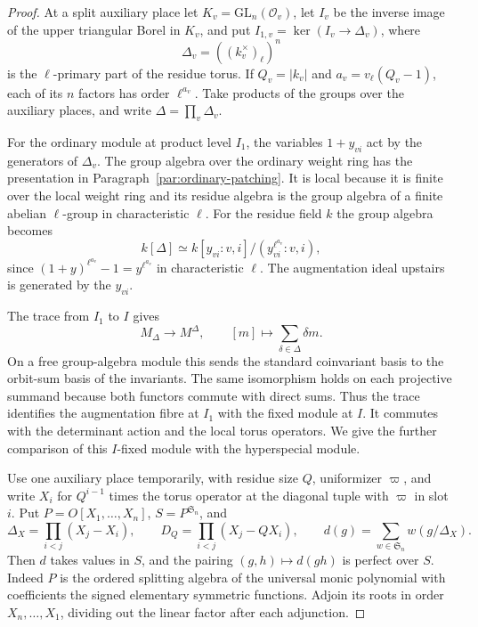 \begin{proof}

At a split auxiliary place let \(K_v=\mathrm{GL}_n(\mathcal O_v)\),
let \(I_v\) be the inverse image of the upper triangular
Borel in \(K_v\), and put \(I_{1,v}=\ker(I_v\to\Delta_v)\),
where
\[
 \Delta_v=((k_v^\times)_\ell)^n
\]
is the
\(\ell\)-primary part of the residue torus. If \(Q_v=|k_v|\)
and \(a_v=v_\ell(Q_v-1)\), each of its \(n\) factors
has order \(\ell^{a_v}\). Take products of the groups over the
auxiliary places, and write \(\Delta=\prod_v\Delta_v\).

For the ordinary module at product level \(I_1\), the
variables \(1+y_{vi}\) act by the generators of \(\Delta_v\).
The group algebra over the ordinary weight ring has the
presentation in Paragraph~\ref{par:ordinary-patching}. It is
local because it is finite over the local weight ring and its
residue algebra is the group algebra of a finite abelian
\(\ell\)-group in characteristic \(\ell\). For the residue field \(k\) the group algebra becomes
\[
 k[\Delta]\simeq k[y_{vi}:v,i]/(y_{vi}^{\ell^{a_v}}:v,i),
\]
since \((1+y)^{\ell^{a_v}}-1=y^{\ell^{a_v}}\) in characteristic \(\ell\). The augmentation ideal upstairs is generated by the \(y_{vi}\).

The trace from \(I_1\) to \(I\) gives
\[
            M_\Delta\longrightarrow M^\Delta,\qquad
              [m]\longmapsto\sum_{\delta\in\Delta}\delta m .
\]
On a free group-algebra module this sends the standard
coinvariant basis to the orbit-sum basis of the invariants. The same isomorphism holds on each
projective summand because both functors commute with direct
sums. Thus the trace identifies the augmentation fibre
at \(I_1\) with the fixed module at \(I\). It commutes
with the determinant action and the local torus operators.
We give the further comparison of this \(I\)-fixed module
with the hyperspecial module.

Use one auxiliary place temporarily, with residue size
\(Q\), uniformizer \(\varpi\), and write \(X_i\) for
\(Q^{i-1}\) times the torus operator at the diagonal tuple
with \(\varpi\) in slot \(i\). Put \(P=O[X_1,\ldots,X_n]\),
\(S=P^{\mathfrak S_n}\), and
\[
 \Delta_X=\prod_{i<j}(X_j-X_i),\qquad
 D_Q=\prod_{i<j}(X_j-QX_i),\qquad
 d(g)=\sum_{w\in\mathfrak S_n} w(g/\Delta_X).
\]
Then \(d\) takes values in \(S\), and the pairing
\((g,h)\mapsto d(gh)\) is perfect over \(S\).
Indeed \(P\) is the ordered splitting algebra of the
universal monic polynomial with coefficients the signed
elementary symmetric functions. Adjoin its roots in
order \(X_n,\ldots,X_1\), dividing out the linear factor
after each adjunction.


\end{proof}
